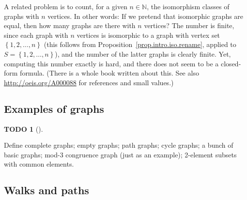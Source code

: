 \documentclass[numbers=enddot,12pt,final,onecolumn,notitlepage]{scrartcl}%
\theoremstyle{definition}
\newtheorem{quest}[theo]{TODO}
\newenvironment{todo}[1][]
{\begin{quest}[#1]\begin{leftbar}}
{\end{leftbar}\end{quest}}
\newcommand{\NN}{\mathbb{N}}
\newcommand{\set}[1]{\left\{ #1 \right\}}
\begin{document}
A related problem is to count, for a given $n \in \NN$,
the isomorphism classes of graphs with $n$ vertices. In other words:
If we pretend that isomorphic graphs are equal, then how many graphs
are there with $n$ vertices? The number is finite, since each graph
with $n$ vertices is isomorphic to a graph with vertex set
$\set{1,2,\ldots, n}$ (this follows from
Proposition~\ref{prop.intro.iso.rename}, applied to
$S = \set{1,2,\ldots, n}$), and the number of the latter graphs is
clearly finite. Yet, computing this number exactly is hard, and there
does not seem to be a closed-form formula. (There is a whole book
\cite{HarPal73} written about this. See also
\url{http://oeis.org/A000088} for references and small values.)

\subsection{\label{sect.intro.paths}Examples of graphs}

\begin{todo}
Define complete graphs; empty graphs; path graphs; cycle graphs; a
bunch of basic graphs; mod-3 congruence graph (just as an example);
2-element subsets with common elements.
\end{todo}

\subsection{\label{sect.intro.walks}Walks and paths}
\end{document}
